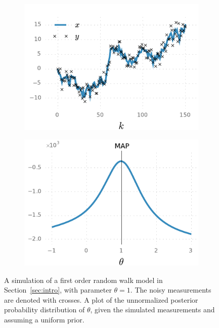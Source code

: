 \begin{figure}[htb]%
    \centering%
    \begin{subfigure}[t]{0.5\textwidth}%
    	\caption{}\label{fig:ar1_simulation}%
    	\includegraphics{img/ar1_ex_a}%
    \end{subfigure}%
    \begin{subfigure}[t]{0.5\textwidth}\centering%
		\caption{}\label{fig:ar1_lh}%
		\includegraphics{img/ar1_ex_b}%
    \end{subfigure}%
	\caption{%
	 A simulation of a first order random walk model in Section~\ref{sec:intro}, with
	parameter $\theta=1$.%
   	The noisy measurements are denoted with crosses. %
   	 A plot of the unnormalized posterior probability distribution 
   	of $\theta$, given the simulated measurements and assuming a uniform prior.%
   	}
	\label{fig:ar1}
 \end{figure}


